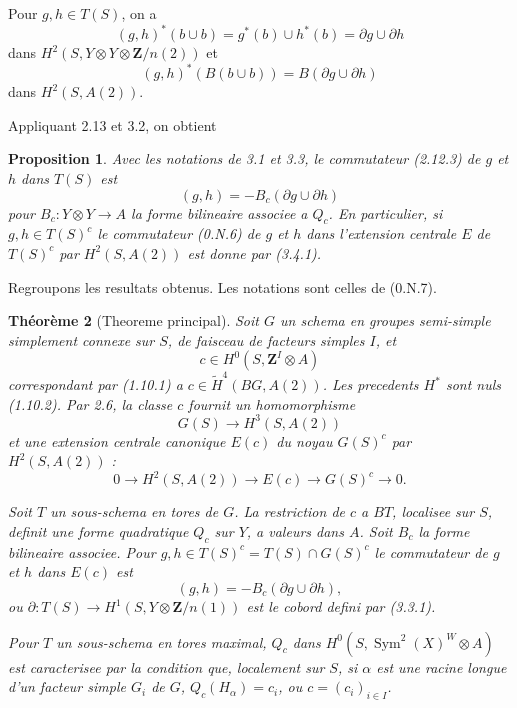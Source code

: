\documentclass[11pt,a4paper]{article}
\theoremstyle{plain}
\newtheorem{theorem}{Th\'eor\`eme}[section]
\newtheorem{proposition}[theorem]{Proposition}
\theoremstyle{definition}
\DeclareMathOperator{\Sym}{Sym}
\begin{document}
Pour $g, h \in T(S)$, on a
\[
(g, h)^*(b \cup b) = g^*(b) \cup h^*(b) = \partial g \cup \partial h
\]
dans $H^2(S, Y \otimes Y \otimes \mathbf{Z}/n(2))$ et
\[
(g, h)^*(B(b \cup b)) = B(\partial g \cup \partial h)
\]
dans $H^2(S, A(2))$.

Appliquant 2.13 et 3.2, on obtient
\begin{proposition}\label{3.4}
Avec les notations de 3.1 et 3.3, le commutateur (2.12.3) de $g$ et $h$ dans $T(S)$ est
\begin{equation}\label{3.4.1}
(g, h) = -B_c(\partial g \cup \partial h)
\end{equation}
pour $B_c : Y \otimes Y \to A$ la forme bilineaire associee a $Q_c$. En particulier, si $g, h \in T(S)^c$ le commutateur (0.N.6) de $g$ et $h$ dans l'extension centrale $E$ de $T(S)^c$ par $H^2(S, A(2))$ est donne par (3.4.1).
\end{proposition}

Regroupons les resultats obtenus. Les notations sont celles de (0.N.7).

\begin{theorem}[Theoreme principal]\label{3.5}
Soit $G$ un schema en groupes semi-simple simplement connexe sur $S$, de faisceau de facteurs simples $I$, et
\[
c \in H^0(S, \mathbf{Z}^I \otimes A)
\]
correspondant par (1.10.1) a $c \in \widetilde{H}^4(BG, A(2))$. Les precedents $H^*$ sont nuls (1.10.2). Par 2.6, la classe $c$ fournit un homomorphisme
\begin{equation}\label{3.5.1}
G(S) \to H^3(S, A(2))
\end{equation}
et une extension centrale canonique $E(c)$ du noyau $G(S)^c$ par $H^2(S, A(2))$ :
\begin{equation}\label{3.5.2}
0 \to H^2(S, A(2)) \to E(c) \to G(S)^c \to 0.
\end{equation}

Soit $T$ un sous-schema en tores de $G$. La restriction de $c$ a $BT$, localisee sur $S$, definit une forme quadratique $Q_c$ sur $Y$, a valeurs dans $A$. Soit $B_c$ la forme bilineaire associee. Pour $g, h \in T(S)^c = T(S) \cap G(S)^c$ le commutateur de $g$ et $h$ dans $E(c)$ est
\begin{equation}\label{3.5.3}
(g, h) = -B_c(\partial g \cup \partial h),
\end{equation}
ou $\partial : T(S) \to H^1(S, Y \otimes \mathbf{Z}/n(1))$ est le cobord defini par (3.3.1).

Pour $T$ un sous-schema en tores maximal, $Q_c$ dans $H^0(S, \Sym^2(X)^W \otimes A)$ est caracterisee par la condition que, localement sur $S$, si $\alpha$ est une racine longue d'un facteur simple $G_i$ de $G$, $Q_c(H_\alpha) = c_i$, ou $c = (c_i)_{i \in I}$.
\end{theorem}
\end{document}

